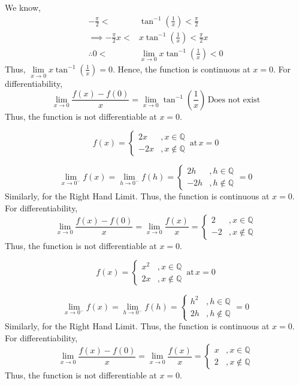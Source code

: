 \begin{anse}
	We know,
	\[\begin{split}
		-\frac{\pi}{2} < &\tan^{-1}(\frac{1}{x}) <\frac{\pi}{2}\\
		\implies -\frac{\pi}{2}x < &x\tan^{-1}(\frac{1}{x}) <\frac{\pi}{2}x\\
		\therefore 0<&\lim\limits_{x\to0}x\tan^{-1}(\frac{1}{x}) <0
	\end{split}\]
	Thus, $\lim\limits_{x\to0}x\tan^{-1}(\frac{1}{x})=0$. Hence, the function is continuous at $x=0$. For differentiability,
	\[\lim\limits_{x\to0}\frac{f(x)-f(0)}{x}=\lim\limits_{x\to0}\tan^{-1}(\frac{1}{x}) \, \text{Does not exist} \]
	Thus, the function is not differentiable at $x=0$.
\end{anse}
\begin{asign}
	\[f(x)=\begin{cases}
		2x &, x\in\mathbb{Q}\\
		-2x &, x\notin\mathbb{Q}
	\end{cases}\,\text{at}\, x=0\]
\end{asign}
\begin{anse}
	\[\lim\limits_{x\to0^-}f(x)=\lim\limits_{h\to0^-}f(h)=\begin{cases}
		2h &, h\in\mathbb{Q}\\
		-2h &, h\notin\mathbb{Q}
	\end{cases}=0\]
	Similarly, for the Right Hand Limit. Thus, the function is continuous at $x=0$. For differentiability,
	\[\lim\limits_{x\to0}\frac{f(x)-f(0)}{x}=\lim\limits_{x\to 0}\frac{f(x)}{x}=\begin{cases}
		2 &, x\in\mathbb{Q}\\
		-2 &, x\notin\mathbb{Q}
	\end{cases}\]
	Thus, the function is not differentiable at $x=0$.
\end{anse}
\begin{asign}
	\[f(x)=\begin{cases}
		x^2 &, x\in\mathbb{Q}\\
		2x &, x\notin\mathbb{Q}
	\end{cases}\,\text{at}\, x=0\]
\end{asign}
\begin{anse}
	\[\lim\limits_{x\to0^-}f(x)=\lim\limits_{h\to0^-}f(h)=\begin{cases}
		h^2 &, h\in\mathbb{Q}\\
		2h &, h\notin\mathbb{Q}
	\end{cases}=0\]
	Similarly, for the Right Hand Limit. Thus, the function is continuous at $x=0$. For differentiability,
	\[\lim\limits_{x\to0}\frac{f(x)-f(0)}{x}=\lim\limits_{x\to 0}\frac{f(x)}{x}=\begin{cases}
		x &, x\in\mathbb{Q}\\
		2 &, x\notin\mathbb{Q}
	\end{cases}\]
	Thus, the function is not differentiable at $x=0$.
\end{anse}
